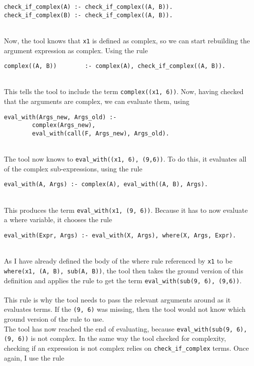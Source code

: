 \begin{lstlisting}
check_if_complex(A) :- check_if_complex((A, B)).
check_if_complex(B) :- check_if_complex((A, B)).
\end{lstlisting}
\mbox{} \\
Now, the tool knows that \lstinline{x1} is defined as complex, so we can start rebuilding the argument expression as complex. Using the rule  \\ %

\begin{lstlisting}
complex((A, B))        :- complex(A), check_if_complex((A, B)).
\end{lstlisting}
\mbox{} \\
This tells the tool to include the term \lstinline{complex((x1, 6))}. Now, having checked that the arguments are complex, we can evaluate them, using \\ %

\begin{lstlisting}
eval_with(Args_new, Args_old) :- 
		complex(Args_new), 
		eval_with(call(F, Args_new), Args_old).
\end{lstlisting}
\mbox{} \\
The tool now knows to \lstinline{eval_with((x1, 6), (9,6))}. To do this, it evaluates all of the complex sub-expressions, using the rule \\ %

\begin{lstlisting}
eval_with(A, Args) :- complex(A), eval_with((A, B), Args).
\end{lstlisting}
\mbox{} \\
This produces the term \lstinline{eval_with(x1, (9, 6))}. Because it has to now evaluate a where variable, it chooses the rule \\ %

\begin{lstlisting}
eval_with(Expr, Args) :- eval_with(X, Args), where(X, Args, Expr).
\end{lstlisting}
\mbox{} \\
As I have already defined the body of the where rule referenced by \lstinline{x1} to be \lstinline{where(x1, (A, B), sub(A, B))}, the tool then takes the ground version of this definition and applies the rule to get the term \lstinline{eval_with(sub(9, 6), (9,6))}. \\ \\%
This rule is why the tool needs to pass the relevant arguments around as it evaluates terms. If the \lstinline{(9, 6)} was missing, then the tool would not know which ground version of the rule to use.\\ %
The tool has now reached the end of evaluating, because \lstinline{eval_with(sub(9, 6), (9, 6))} is not complex. In the same way the tool checked for complexity, checking if an expression is not complex relies on \lstinline{check_if_complex} terms. Once again, I use the rule\\

